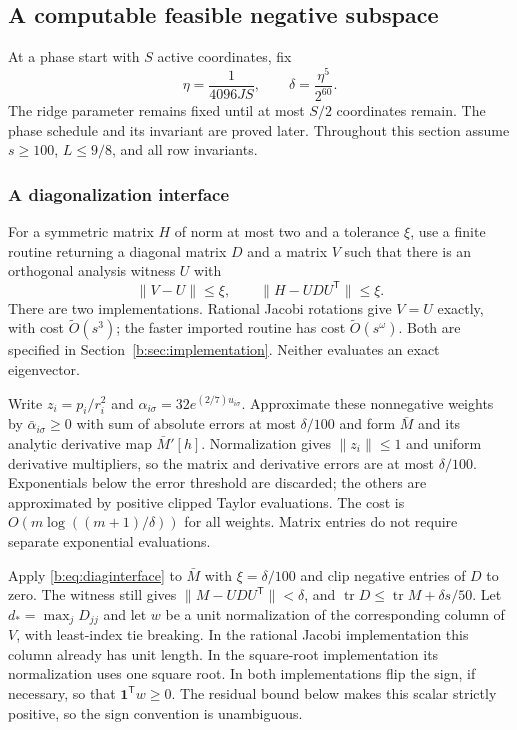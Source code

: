 \documentclass[11pt]{amsart}
\theoremstyle{definition}\newtheorem{definition}[theorem]{Definition}
\theoremstyle{remark}\newtheorem{remark}[theorem]{Remark}
\numberwithin{equation}{section}
\newcommand{\tr}{\operatorname{tr}}
\newcommand{\one}{\mathbf1}
\newcommand{\T}{\mathsf T}
\begin{document}
\subsection{A computable feasible negative subspace}\label{b:sec:subspace}
At a phase start with $S$ active coordinates, fix
\[
 \eta=\frac1{4096JS},\qquad \delta=\frac{\eta^5}{2^{60}}.
\]
The ridge parameter remains fixed until at most $S/2$ coordinates remain.
The phase schedule and its invariant are proved later. Throughout this section assume
$s\ge100$, $L\le9/8$, and all row invariants.

\subsubsection{A diagonalization interface}
For a symmetric matrix $H$ of norm at most two and a tolerance $\xi$, use a
finite routine returning a diagonal matrix $D$ and a matrix $V$ such that
there is an orthogonal analysis witness $U$ with
\begin{equation}\label{b:eq:diaginterface}
 \|V-U\|\le\xi,\qquad\|H-UDU^\T\|\le\xi.
\end{equation}
There are two implementations. Rational Jacobi rotations give
$V=U$ exactly, with cost $\widetilde O(s^3)$; the faster imported routine
has cost $\widetilde O(s^\omega)$. Both are specified in
Section~\ref{b:sec:implementation}. Neither evaluates an exact eigenvector.

Write $z_i=p_i/r_i^2$ and $\alpha_{i\sigma}=32e^{(2/7)u_{i\sigma}}$.
Approximate these nonnegative weights by $\bar\alpha_{i\sigma}\ge0$ with
sum of absolute errors at most $\delta/100$ and form $\bar M$ and its
analytic derivative map $\bar M'[h]$. Normalization gives $\|z_i\|\le1$
and uniform derivative multipliers, so the matrix and derivative errors are
at most $\delta/100$. Exponentials below the error threshold are discarded; the others are
approximated by positive clipped Taylor evaluations. The cost is
$O(m\log((m+1)/\delta))$ for all weights. Matrix entries do not require
separate exponential evaluations.

Apply \eqref{b:eq:diaginterface} to $\bar M$ with $\xi=\delta/100$ and clip
negative entries of $D$ to zero. The witness still gives
$\|M-UDU^\T\|<\delta$, and
$\tr D\le\tr M+\delta s/50$. Let $d_* =\max_jD_{jj}$ and
let $w$ be a unit normalization of the corresponding column of $V$, with
least-index tie breaking. In the rational Jacobi implementation this column
already has unit length. In the square-root implementation its normalization
uses one square root. In both implementations flip the sign, if necessary,
so that $\one^\T w\ge0$. The residual bound below makes this scalar
strictly positive, so the sign convention is unambiguous.
\end{document}
